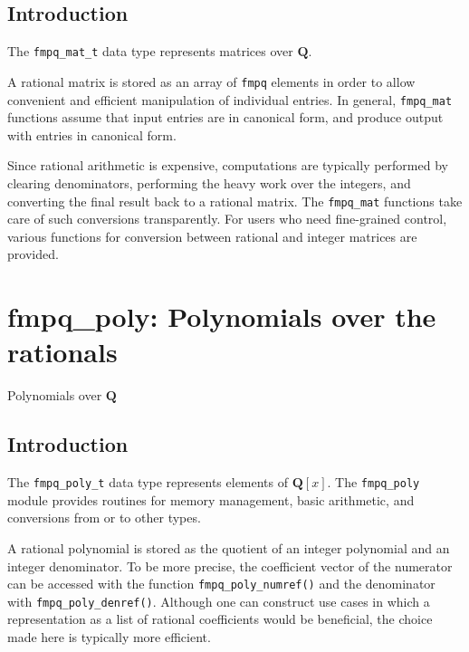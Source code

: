 \documentclass[a4paper,10pt]{book}
\newcommand{\Q}{\mathbf{Q}}%
\newcommand{\code}{\lstinline}
\begin{document}
{{\section{Introduction}

The \code{fmpq_mat_t} data type represents matrices over $\Q$.

A rational matrix is stored as an array of \code{fmpq} elements in order
to allow convenient and efficient manipulation of individual entries.
In general, \code{fmpq_mat} functions assume that input entries are
in canonical form, and produce output with entries in canonical form.

Since rational arithmetic is expensive, computations are typically performed
by clearing denominators, performing the heavy work over the integers,
and converting the final result back to a rational matrix. The
\code{fmpq_mat} functions take care of such conversions transparently.
For users who need fine-grained control, various
functions for conversion between rational and integer matrices are provided.




\chapter{fmpq\_poly: Polynomials over the rationals}
\epigraph{Polynomials over $\Q$}{}

\section{Introduction}

The \code{fmpq_poly_t} data type represents elements of $\Q[x]$. The
\code{fmpq_poly} module provides routines for memory management, basic
arithmetic, and conversions from or to other types.

A rational polynomial is stored as the quotient of an integer polynomial
and an integer denominator.  To be more precise, the coefficient vector
of the numerator can be accessed with the function \code{fmpq_poly_numref()}
and the denominator with \code{fmpq_poly_denref()}.  Although one can
construct use cases in which a representation as a list of rational
coefficients would be beneficial, the choice made here is typically
more efficient.

}}
\end{document}
